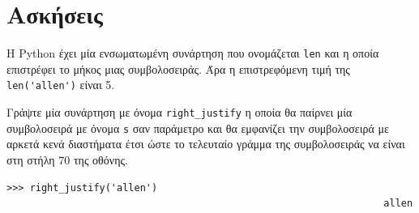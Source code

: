 \documentclass[10pt]{book}
\begin{document}
\section{Ασκήσεις}


\begin{exercise}

Η Python έχει μία ενσωματωμένη συνάρτηση που ονομάζεται {\tt len} και
η οποία επιστρέφει το μήκος μιας συμβολοσειράς. Άρα η επιστρεφόμενη τιμή της  \verb"len('allen')" είναι 5.

Γράψτε μία συνάρτηση με όνομα \verb"right_justify" η οποία θα παίρνει
μία συμβολοσειρά με όνομα {\tt s} σαν παράμετρο και θα εμφανίζει 
την συμβολοσειρά με αρκετά κενά διαστήματα έτσι ώστε το τελευταίο γράμμα της
συμβολοσειράς να είναι στη στήλη 70 της οθόνης.


\begin{verbatim}
>>> right_justify('allen')
                                                                 allen
\end{verbatim}
\end{exercise}
\end{document}
